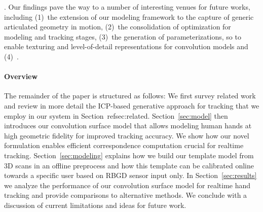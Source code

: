 %
\hspace{0in}
%
.
Our findings pave the way to a number of interesting venues for future works, including 
(1)~the extension of our modeling framework to the capture of generic articulated geometry in motion, 
(2)~the consolidation of optimization for modeling and tracking stages, 
(3)~the generation of parameterizations, so to enable texturing and level-of-detail representations for convolution models and
(4)~. \
% 


\paragraph{Overview}
The remainder of the paper is structured as follows: We first survey related work and review in more detail the ICP-based generative approach for tracking that we employ in our system in Section~ref{sec:related}.
Section~\ref{sec:model} then introduces our convolution surface model that allows modeling human hands at high geometric fidelity for improved tracking accuracy. We show how our novel formulation enables efficient correspondence computation crucial for realtime tracking.
Section~\ref{sec:modeling} explains how we build our template model from 3D scans in an offline preprocess and how this template can be calibrated online towards a specific user based on RBGD sensor input only.
In Section~\ref{sec:results} we analyze the performance of our convolution surface model for realtime hand tracking and provide comparisons to alternative methods. We conclude with a discussion of current limitations and ideas for future work.



